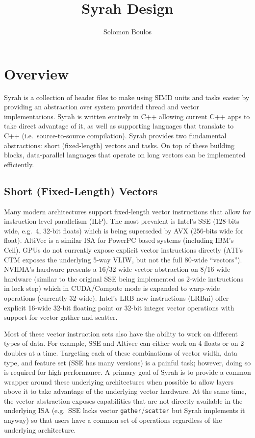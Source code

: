 \documentclass[11pt]{amsart}
\title{Syrah Design}
\author{Solomon Boulos}
\date{}                                           %
\newcommand{\vectorOp}[1]{\texttt{#1}}
\begin{document}
\maketitle

\section{Overview}

Syrah is a collection of header files to make using SIMD units and
tasks easier by providing an abstraction over system provided thread
and vector implementations. Syrah is written entirely in C++ allowing
current C++ apps to take direct advantage of it, as well as supporting
languages that translate to C++ (i.e.\ source-to-source
compilation). Syrah provides two fundamental abstractions: short
(fixed-length) vectors and tasks. On top of these building blocks,
data-parallel languages that operate on long vectors can be
implemented efficiently.

\subsection{Short (Fixed-Length) Vectors}

Many modern architectures support fixed-length vector instructions
that allow for instruction level parallelism (ILP). The most prevalent
is Intel's SSE (128-bits wide, e.g.\ 4, 32-bit floats) which is being
superseded by AVX (256-bits wide for float). AltiVec is a similar ISA
for PowerPC based systems (including IBM's Cell). GPUs do not
currently expose explicit vector instructions directly (ATI's CTM
exposes the underlying 5-way VLIW, but not the full 80-wide
``vectors''). NVIDIA's hardware presents a 16/32-wide vector
abstraction on 8/16-wide hardware (similar to the original SSE being
implemented as 2-wide instructions in lock step) which in CUDA/Compute
mode is expanded to warp-wide operations (currently 32-wide). Intel's
LRB new instructions (LRBni) offer explicit 16-wide 32-bit floating
point or 32-bit integer vector operations with support for vector
gather and scatter.

Most of these vector instruction sets also have the ability to work on
different types of data. For example, SSE and Altivec can either work
on 4 floats or on 2 doubles at a time. Targeting each of these
combinations of vector width, data type, and feature set (SSE has many
versions) is a painful task; however, doing so is required for high
performance. A primary goal of Syrah is to provide a common wrapper
around these underlying architectures when possible to allow layers
above it to take advantage of the underlying vector hardware. At the
same time, the vector abstraction exposes capabilities that are not
directly available in the underlying ISA (e.g.\ SSE lacks vector
\vectorOp{gather}/\vectorOp{scatter} but Syrah implements it anyway)
so that users have a common set of operations regardless of the
underlying architecture.
\end{document}
